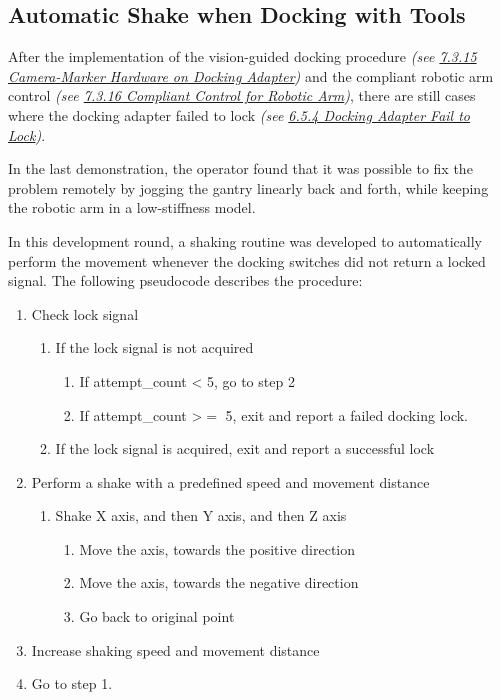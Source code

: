 


\subsection{Automatic Shake when Docking with Tools}

After the implementation of the vision-guided docking procedure \textit{(see \ul{7.3.15 Camera-Marker Hardware on Docking Adapter})} and the compliant robotic arm control \textit{(see \ul{7.3.16 Compliant Control for Robotic Arm})}, there are still cases where the docking adapter failed to lock \textit{(see \ul{6.5.4 Docking Adapter Fail to Lock})}.

In the last demonstration, the operator found that it was possible to fix the problem remotely by jogging the gantry linearly back and forth, while keeping the robotic arm in a low-stiffness model. 

In this development round, a shaking routine was developed to automatically perform the movement whenever the docking switches did not return a locked signal. The following pseudocode describes the procedure:

\begin{enumerate}
	\item Check lock signal

\begin{enumerate}
	\item If the lock signal is not acquired

\begin{enumerate}
	\item If attempt\_count < 5, go to step 2

	\item If attempt\_count >$=$ 5, exit and report a failed docking lock.

\end{enumerate}
	\item If the lock signal is acquired, exit and report a successful lock

\end{enumerate}
	\item Perform a shake with a predefined speed and movement distance

\begin{enumerate}
	\item Shake X axis, and then Y axis, and then Z axis

\begin{enumerate}
	\item Move the axis, towards the positive direction

	\item Move the axis, towards the negative direction

	\item Go back to original point

\end{enumerate}
\end{enumerate}
	\item Increase shaking speed and movement distance

	\item Go to step 1.

\end{enumerate}

